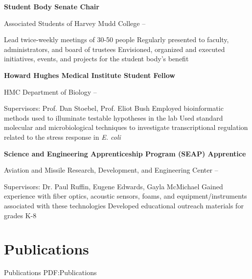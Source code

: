 \documentclass[letterpaper,10pt,oneside]{article}
\begin{document}
\begin{body}
\BigGap

{\textbf{Student Body Senate Chair}}

\GapNoBreak
\BulletItem
Associated Students of Harvey Mudd College 
\hfill
{} --
\begin{detail}
\SubBulletItemBullet
Lead twice-weekly meetings of 30-50 people
\SubBulletItemBullet
Regularly presented to faculty, administrators, and board of trustees
\SubBulletItemBullet
Envisioned, organized and executed initiatives, events, and projects for the student body's benefit
\end{detail}

\BigGap

{\textbf{Howard Hughes Medical Institute Student Fellow}}

\GapNoBreak
\BulletItem
HMC Department of Biology
\hfill
{} --
\begin{detail}
\SubBulletItem
Supervisors:
Prof. Dan Stoebel, Prof. Eliot Bush
\SubBulletItemBullet
Employed bioinformatic methods used to illuminate testable hypotheses in the  lab
\SubBulletItemBullet
Used standard molecular and microbiological techniques to investigate transcriptional regulation related to the stress response in {\it E. coli}
\end{detail}

\BigGap

{\textbf{Science and Engineering Apprenticeship Program (SEAP) Apprentice}}

\GapNoBreak
\BulletItem
Aviation and Missile Research, Development, and Engineering Center \hfill
{} --
\begin{detail}
\SubBulletItem
Supervisors:
Dr. Paul Ruffin, Eugene Edwards, Gayla McMichael
\SubBulletItemBullet
Gained experience with fiber optics, acoustic sensors, foams, and equipment/instruments associated with these technologies
\SubBulletItemBullet
Developed educational outreach materials for grades K-8
\end{detail}


\section
{Publications}
{Publications}
{PDF:Publications}


\end{body}
\end{document}
